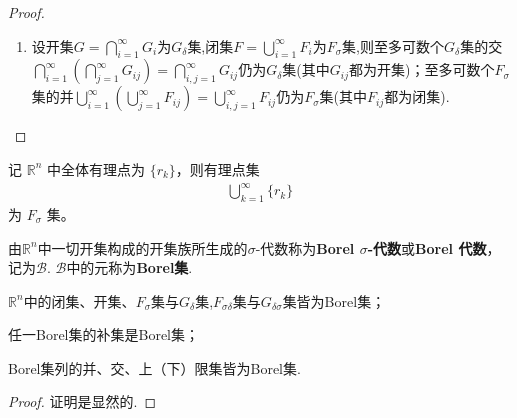 \documentclass[../../main.tex]{subfiles}%
\begin{document}
\begin{proof}
\begin{enumerate}[(1)]
设$F$为闭集, 则$G = \mathbb{R}^n \setminus F$为开集, 由上知$G = \bigcup_{n=1}^\infty F_n$, $F_n(n \in \mathbb{N})$为闭集, 从而$F_n^c$为开集, 且有
\begin{align*}
F=G^c=\left( \bigcup_{n=1}^{\infty}{F_n} \right) ^c\xlongequal{\mathrm{De}\, \text{Morgan公式}}\bigcap_{n=1}^{\infty}{F_{n}^{c}},
\end{align*}
即闭集$F$为$G_\delta$集.

\item 设开集$G=\bigcap\limits_{i=1}^{\infty}G_i$为$G_{\delta}$集,闭集$F=\bigcup\limits_{i=1}^{\infty}F_i$为$F_{\sigma}$集,则至多可数个$G_{\delta}$集的交$\bigcap\limits_{i=1}^{\infty}\left(\bigcap\limits_{j=1}^{\infty}G_{ij}\right)=\bigcap\limits_{i,j=1}^{\infty}G_{ij}$仍为$G_{\delta}$集(其中$G_{ij}$都为开集)；至多可数个$F_{\sigma}$集的并$\bigcup\limits_{i=1}^{\infty}\left(\bigcup\limits_{j=1}^{\infty}F_{ij}\right)=\bigcup\limits_{i,j=1}^{\infty}F_{ij}$仍为$F_{\sigma}$集(其中$F_{ij}$都为闭集).
\end{enumerate}

\end{proof}

\begin{example}
记 $\mathbb{R}^n$ 中全体有理点为 $\{r_k\}$，则有理点集
\begin{align*}
\bigcup_{k = 1}^{\infty} \{r_k\}
\end{align*}
为 $F_{\sigma}$ 集。 
\end{example}

\begin{definition}[Borel集]\label{definition:Borel集}
由$\mathbb{R}^n$中一切开集构成的开集族所生成的$\sigma$-代数称为\textbf{Borel $\sigma$-代数}或\textbf{Borel 代数}，记为$\mathscr{B}$. $\mathscr{B}$中的元称为\textbf{Borel集}.
\end{definition}

\begin{proposition}[Borel集的基本性质]\label{proposition:Borel集的基本性质}
$\mathbb{R}^n$中的闭集、开集、$F_{\sigma}$集与$G_{\delta}$集,$F_{\sigma\delta}$集与$G_{\delta\sigma}$集皆为Borel集；

任一Borel集的补集是Borel集；

Borel集列的并、交、上（下）限集皆为Borel集. 
\end{proposition}
\begin{proof}

证明是显然的.

\end{proof}
\end{document}
